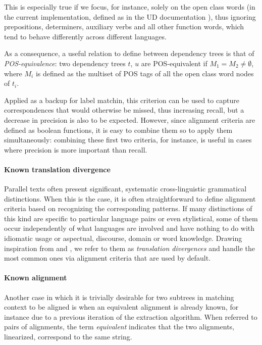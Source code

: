 \documentclass[11pt]{article}
\begin{document}
This is especially true if we focus, for instance, solely on the open class words (in the current implementation, defined as in the UD documentation \cite{dummy}), thus ignoring prepositions, determiners, auxiliary verbs and all other function words, which tend to behave differently across different languages.

As a consequence, a useful relation to define between dependency trees is that of \textit{POS-equivalence}: two dependency trees $t$, $u$ are POS-equivalent if $M_1 = M_2 \neq \emptyset$, where $M_i$ is defined as the multiset of POS tags of all the open class word nodes of $t_i$. 

Applied as a backup for label matchin, this criterion can be used to capture correspondences that would otherwise be missed, thus increasing recall, but a decrease in precision is also to be expected. 
However, since alignment criteria are defined as boolean functions, it is easy to combine them so to apply them simultaneously: combining these first two criteria, for instance, is useful in cases where precision is more important than recall.

\paragraph{Known translation divergence}
Parallel texts often present significant, systematic cross-linguistic grammatical distinctions. 
When this is the case, it is often straightforward to define alignment criteria based on recognizing the corresponding patterns.
If many distinctions of this kind are specific to particular language pairs or even stylistical, some of them occur independently of what languages are involved and have nothing to do with idiomatic usage or aspectual, discourse, domain or word knowledge. Drawing inspiration from \cite{dummy} and \cite{dummy}, we refer to them as \textit{translation divergences} and handle the most common ones via alignment criteria that are used by default. 


\paragraph{Known alignment} \label{ka}
Another case in which it is trivially desirable for two subtrees in matching context to be aligned is when an equivalent alignment is already known, for instance due to a previous iteration of the extraction algorithm. 
When referred to pairs of alignments, the term \textit{equivalent} indicates that the two alignments, linearized, correspond to the same string.
\end{document}
